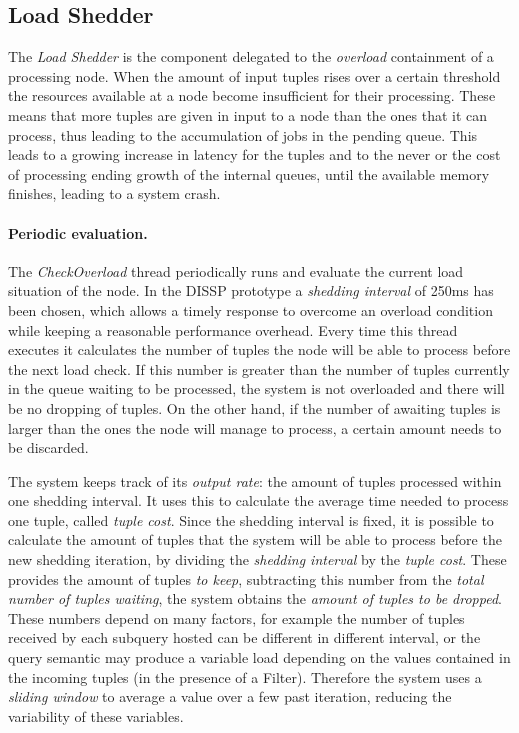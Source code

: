 \subsection{Load Shedder}

The \emph{Load Shedder} is the component delegated to the \emph{overload} containment of a processing
node. When the amount of input tuples rises over a certain threshold the resources available at a node
become insufficient for their processing. These means that more tuples are given in input to a node than
the ones that it can process, thus leading to the accumulation of jobs in the pending queue. This leads
to a growing increase in latency for the tuples and to the never or the cost of processing ending growth
of the internal queues, until the available memory finishes, leading to a system crash. 

\paragraph{Periodic evaluation.}
The \emph{CheckOverload} thread periodically runs and evaluate the
current load situation of the node.
In the DISSP prototype a \emph{shedding interval} of 250ms has been chosen, which allows a timely response to
overcome an overload condition while keeping a reasonable performance overhead. Every time this thread
executes it calculates the number of tuples the node will be able to process before the next load check.
If this number is greater than the number of tuples currently in the queue waiting to be processed, the
system is not overloaded and there will be no dropping of tuples. On the other hand, if the number of
awaiting tuples is larger than the ones the node will manage to process, a certain amount needs to be
discarded. 

The system keeps track of its \emph{output rate}: the amount of tuples processed within one shedding
interval. It uses this to calculate the average time needed to process one tuple, called \emph{tuple
cost}.
Since the shedding interval is
fixed, it is possible to calculate the amount of tuples that the system will be able to process before
the new shedding iteration, by dividing the \emph{shedding interval} by the \emph{tuple cost}. These
provides the amount of tuples \emph{to keep}, subtracting this number from the \emph{total number of
tuples waiting}, the system obtains the \emph{amount of tuples to be dropped}.
These numbers depend on many factors, for example the number of tuples received by each subquery
hosted can be different in different interval, or the query semantic may produce a variable load
depending on the values contained in the incoming tuples (\ie in the presence of a Filter). Therefore the
system uses a \emph{sliding window} to average a value over a few past iteration, reducing the
variability of these variables.


